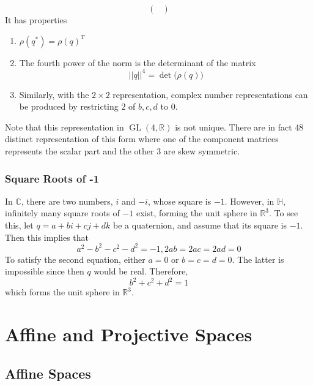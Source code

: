 \documentclass{article}
\DeclareMathOperator{\GL}{GL}
\begin{document}
\begin{proposition}
\begin{equation}
\begin{pmatrix}
        \end{pmatrix}
      \end{equation}
      It has properties
      \begin{enumerate}
        \item $\rho(q^*) = \rho(q)^T$
        \item The fourth power of the norm is the determinant of the matrix 
          \begin{equation}
            ||q||^4 = \det\big( \rho (q)\big)
          \end{equation}
        \item Similarly, with the $2\times 2$ representation, complex number representations can be produced by restricting $2$ of $b, c, d$ to $0$. 
      \end{enumerate}
      \end{proposition}

      Note that this representation in $\GL(4, \mathbb{R})$ is not unique. There are in fact 48 distinct representation of this form where one of the component matrices represents the scalar part and the other 3 are skew symmetric. 

    \subsubsection{Square Roots of -1}

      In $\mathbb{C}$, there are two numbers, $i$ and $-i$, whose square is $-1$. However, in $\mathbb{H}$, infinitely many square roots of $-1$ exist, forming the unit sphere in $\mathbb{R}^3$. To see this, let $q = a+bi+cj+dk$ be a quaternion, and assume that its square is $-1$. Then this implies that
      \begin{equation}
        a^2 - b^2 -c^2 -d^2 = -1, 2ab = 2ac = 2ad = 0
      \end{equation}
      To satisfy the second equation, either $a=0$ or $b=c=d=0$. The latter is impossible since then $q$ would be real. Therefore, 
      \begin{equation}
        b^2 + c^2 + d^2 = 1
      \end{equation}
      which forms the unit sphere in $\mathbb{R}^3$. 

\section{Affine and Projective Spaces}

  \subsection{Affine Spaces}
\end{document}
